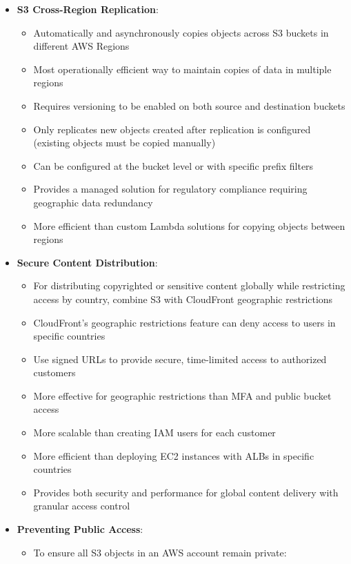 \documentclass[11pt,a4paper]{report}
\begin{document}
\begin{itemize}
\begin{itemize}
\end{itemize}
  \item \textbf{S3 Cross-Region Replication}:
\begin{itemize}
  \item Automatically and asynchronously copies objects across S3 buckets in different AWS Regions
  \item Most operationally efficient way to maintain copies of data in multiple regions
  \item Requires versioning to be enabled on both source and destination buckets
  \item Only replicates new objects created after replication is configured (existing objects must be copied manually)
  \item Can be configured at the bucket level or with specific prefix filters
  \item Provides a managed solution for regulatory compliance requiring geographic data redundancy
  \item More efficient than custom Lambda solutions for copying objects between regions
\end{itemize}
  \item \textbf{Secure Content Distribution}:
\begin{itemize}
  \item For distributing copyrighted or sensitive content globally while restricting access by country, combine S3 with CloudFront geographic restrictions
  \item CloudFront's geographic restrictions feature can deny access to users in specific countries
  \item Use signed URLs to provide secure, time-limited access to authorized customers
  \item More effective for geographic restrictions than MFA and public bucket access
  \item More scalable than creating IAM users for each customer
  \item More efficient than deploying EC2 instances with ALBs in specific countries
  \item Provides both security and performance for global content delivery with granular access control
\end{itemize}
  \item \textbf{Preventing Public Access}:
\begin{itemize}
  \item To ensure all S3 objects in an AWS account remain private:
\begin{itemize}

\end{itemize}
\end{itemize}
\end{itemize}
\end{document}
